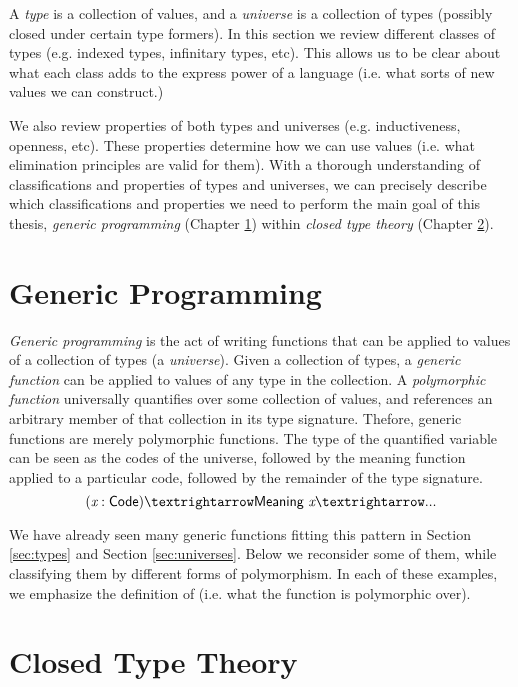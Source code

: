 \documentclass[12pt]{report}
\newcommand{\refch}[1]{Chapter \ref{ch:#1}}
\newcommand{\refsec}[1]{Section \ref{sec:#1}}
\newcommand{\AgdaFun}[1]{\AgdaFunction{#1}}
\newcommand{\AgdaVar}[1]{\AgdaBound{#1}}
\theoremstyle{definition}
\theoremstyle{remark}
\numberwithin{definition}{section}
\numberwithin{equation}{section}
\numberwithin{proposition}{section}
\numberwithin{conjecture}{section}
\numberwithin{theorem}{section}
\numberwithin{lemma}{section}
\numberwithin{corollary}{section}
\numberwithin{example}{section}
\numberwithin{remark}{section}
\begin{document}
A \textit{type} is a collection of values, and a \textit{universe} is
a collection of types (possibly closed under certain type formers).
In this section we review different classes of types (e.g. indexed
types, infinitary types, etc).
This allows us to be clear about what each class adds
to the express power of a language (i.e. what sorts of new values we
can construct.)

We also review properties of both types and universes
(e.g. inductiveness, openness, etc). These properties determine how we
can use values (i.e. what elimination principles are valid for them).
With a thorough understanding of classifications and
properties of types and universes, we can precisely describe which
classifications and properties we need to perform the main goal of
this thesis, \textit{generic programming} (\refch{generic}) within
\textit{closed type theory} (\refch{closedtt}).




\chapter{Generic Programming}\label{ch:generic}

\textit{Generic programming} is the act of writing
functions that can be applied to values of a collection of types
(a \textit{universe}).
Given a collection of types, a \textit{generic function} can be
applied to values of any type in the collection. A
\textit{polymorphic function} universally
quantifies over some collection of values, and references an arbitrary
member of that collection in its type signature. Thefore, generic
functions are merely polymorphic functions.
The type of the quantified variable can be seen as the codes of the
universe, followed by the meaning function applied to a particular
code, followed by the remainder of the type signature.
$$
(\AgdaVar{x} : \AgdaFun{Code}) → \AgdaFun{Meaning}~\AgdaVar{x} → ...
$$

We have already seen many generic functions fitting this pattern in
\refsec{types} and \refsec{universes}. Below we reconsider some of
them, while classifying them by different forms of polymorphism. In
each of these examples, we emphasize the definition of
\AgdaFun{Code} (i.e. what the function is polymorphic over).






\chapter{Closed Type Theory}\label{ch:closedtt}
\end{document}
